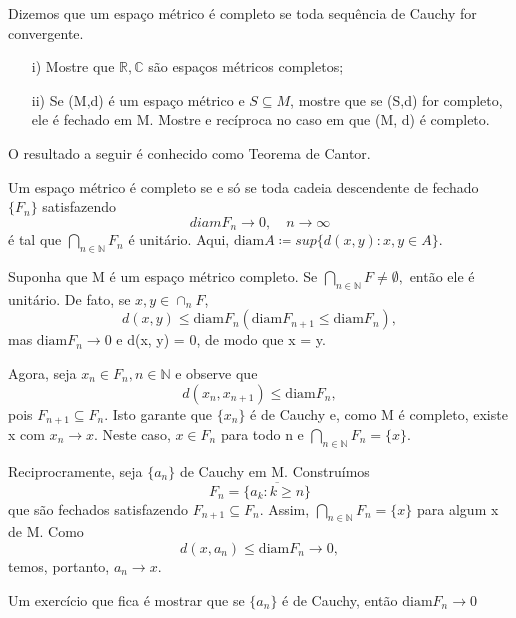 \documentclass[complex.tex]{subfiles}
\begin{document}
Dizemos que um espaço métrico é completo se toda sequência de Cauchy for convergente.
\begin{exer*}
	\begin{itemize}
		\item[i)] Mostre que $\mathbb{R}, \mathbb{C}$ são espaços métricos completos;
		\item[ii)] Se (M,d) é um espaço métrico e $S\subseteq{M}$, mostre que se (S,d) for completo, ele é fechado em M.
		      Mostre e recíproca no caso em que (M, d) é completo.
	\end{itemize}
\end{exer*}
O resultado a seguir é conhecido como Teorema de Cantor.
\begin{theorem*}
	Um espaço métrico é completo se e só se toda cadeia descendente de fechado $\{F_{n}\} $ satisfazendo
	$$
		diam F_{n}\to{0}, \quad n\to\infty
	$$
	é tal que $\bigcap_{n\in \mathbb{N}}F_{n}$ é unitário. Aqui, $\mathrm{diam} A\coloneqq sup\{d(x, y): x, y\in{A}\}.$
\end{theorem*}
\begin{proof*}
	Suponha que M é um espaço métrico completo. Se $\bigcap\limits _{n\in \mathbb{N}}F\neq\emptyset,$ então ele é unitário.
	De fato, se $x, y\in{\cap_n{F}}$,
	$$
		d(x, y)\leq \mathrm{diam} F _{n} (\mathrm{diam} F _{n+1}\leq \mathrm{diam} F _{n}),
	$$
	mas $\mathrm{diam} F _{n}\to{0}$ e d(x, y) = 0, de modo que x = y.

	Agora, seja $x _{n}\in F _{n}, n\in \mathbb{N}$ e observe que
	$$
		d(x _{n}, x _{n+1})\leq \mathrm{diam} F _{n},
	$$
	pois $F _{n+1}\subseteq{F _{n}}$. Isto garante que $\{x_{n}\}$ é de Cauchy e, como M é completo, existe x com $x_{n}\to{x}$.
	Neste caso, $x\in{F_{n}}$ para todo n e $\bigcap _{n\in \mathbb{N}}F_{n}=\{x\}.$

	Reciprocramente, seja $\{a_{n}\}$ de Cauchy em M. Construímos
	$$
		F_{n} = \overline{\{a_{k}: k\geq{n}\}}
	$$
	que são fechados satisfazendo $F_{n+1}\subseteq{F_{n}}.$ Assim, $\bigcap\limits _{n\in \mathbb{N}}F_{n} = \{x\}$ para algum
	x de M. Como
	$$
		d(x, a_{n})\leq \mathrm{diam}F_{n}\to{0},
	$$
	temos, portanto, $a_{n}\to{x}.$
	\qedsymbol
\end{proof*}
Um exercício que fica é mostrar que se $\{a_{n}\}$ é de Cauchy, então $\mathrm{diam}F_{n}\to{0}$
\end{document}
